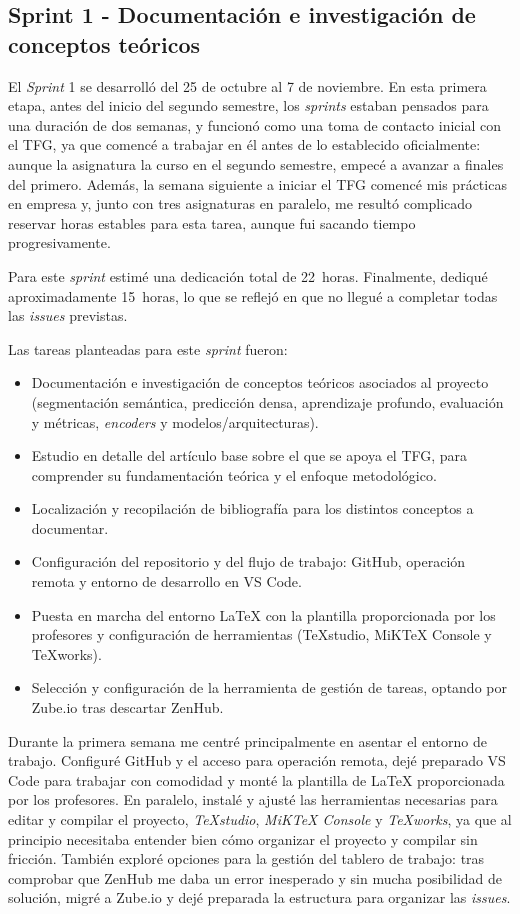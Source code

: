 \subsection{Sprint 1 - Documentación e investigación de conceptos teóricos}
El \textit{Sprint} 1 se desarrolló del 25 de octubre al 7 de noviembre. En esta primera etapa, antes del inicio del segundo semestre, los \textit{sprints} estaban pensados para una duración de dos semanas, y funcionó como una toma de contacto inicial con el TFG, ya que comencé a trabajar en él antes de lo establecido oficialmente: aunque la asignatura la curso en el segundo semestre, empecé a avanzar a finales del primero. Además, la semana siguiente a iniciar el TFG comencé mis prácticas en empresa y, junto con tres asignaturas en paralelo, me resultó complicado reservar horas estables para esta tarea, aunque fui sacando tiempo progresivamente.

Para este \textit{sprint} estimé una dedicación total de 22~horas. Finalmente, dediqué aproximadamente 15~horas, lo que se reflejó en que no llegué a completar todas las \textit{issues} previstas.

Las tareas planteadas para este \textit{sprint} fueron:
\begin{itemize}
	\item Documentación e investigación de conceptos teóricos asociados al proyecto (segmentación semántica, predicción densa, aprendizaje profundo, evaluación y métricas, \textit{encoders} y modelos/arquitecturas).
	\item Estudio en detalle del artículo base sobre el que se apoya el TFG, para comprender su fundamentación teórica y el enfoque metodológico.
	\item Localización y recopilación de bibliografía para los distintos conceptos a documentar.
	\item Configuración del repositorio y del flujo de trabajo: GitHub, operación remota y entorno de desarrollo en VS Code.
	\item Puesta en marcha del entorno \LaTeX{} con la plantilla proporcionada por los profesores y configuración de herramientas (\TeX{}studio, MiK\TeX{} Console y \TeX{}works).
	\item Selección y configuración de la herramienta de gestión de tareas, optando por Zube.io tras descartar ZenHub.
\end{itemize}

Durante la primera semana me centré principalmente en asentar el entorno de trabajo. Configuré GitHub y el acceso para operación remota, dejé preparado VS Code para trabajar con comodidad y monté la plantilla de \LaTeX{} proporcionada por los profesores. En paralelo, instalé y ajusté las herramientas necesarias para editar y compilar el proyecto, \textit{\TeX{}studio}, \textit{MiK\TeX{} Console} y \textit{\TeX{}works}, ya que al principio necesitaba entender bien cómo organizar el proyecto y compilar sin fricción. También exploré opciones para la gestión del tablero de trabajo: tras comprobar que ZenHub me daba un error inesperado y sin mucha posibilidad de solución, migré a Zube.io y dejé preparada la estructura para organizar las \textit{issues}.

